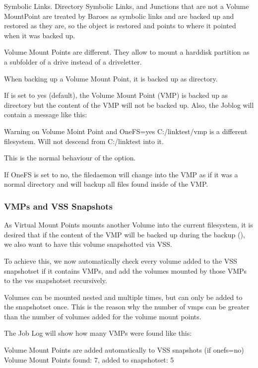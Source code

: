 Symbolic Links. Directory Symbolic Links, and Junctions that are not a Volume MountPoint are treated by Baroes as symbolic links and are backed up and restored as they are, so the object is restored and points to where it pointed when it was backed up.

Volume Mount Points are different. They allow to mount a harddisk partition as a subfolder of a drive instead of a driveletter.

When backing up a Volume Mount Point, it is backed up as directory.

If  is set to yes (default), the Volume Mount Point (VMP) is backed up as directory but the content of the VMP will not be backed up. Also, the Joblog will contain a message like this:

\begin{bmessage}{Warning on Volume Moint Point and OneFS=yes}
C:/linktest/vmp is a different filesystem. Will not descend from C:/linktest into it.
\end{bmessage}

This is the normal behaviour of the  option. 

If OneFS is set to no, the filedaemon will change into the VMP as if it was a normal directory and will backup all files found inside of the VMP.


\subsubsection{VMPs and VSS Snapshots}

As Virtual Mount Points mounts another Volume into the current filesystem, it is desired that if the content of the VMP will be backed up during the backup (), we also want to have this volume snapshotted via VSS.

To achieve this, we now automatically check every volume added to the VSS snapshotset if it contains VMPs, and add the volumes mounted by those VMPs to the vss snapshotset recursively.

Volumes can be mounted nested and multiple times, but can only be added to the snapshotset once. This is the reason why the number of vmps can be greater than the number of volumes added for the volume mount points.

The Job Log will show how many VMPs were found like this:

\begin{bmessage}{Volume Mount Points are added automatically to VSS snapshots (if onefs=no)}
Volume Mount Points found: 7, added to snapshotset: 5
\end{bmessage}

